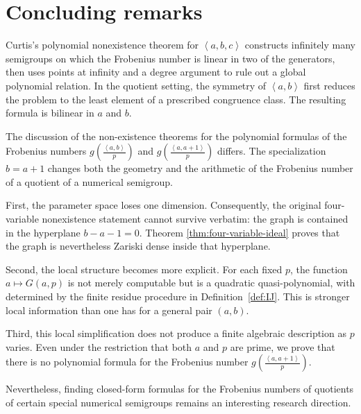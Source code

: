 \documentclass[reqno, 12pt]{article}
\numberwithin{equation}{section}
\theoremstyle{definition}
\newcommand{\gen}[1]{\left\langle #1\right\rangle}
\begin{document}
\section{Concluding remarks}\label{Section-Finily-CR}

Curtis's polynomial nonexistence theorem \cite{F.Curtis} for $\gen{a,b,c}$ constructs infinitely many semigroups on which the Frobenius number is linear in two of the generators, then uses points at infinity and a degree argument to rule out a global polynomial relation.  In the quotient setting, the symmetry of $\gen{a,b}$ first reduces the problem to the least element of a prescribed congruence class.  The resulting formula is bilinear in $a$ and $b$.

The discussion of the non-existence theorems for the polynomial formulas of the Frobenius numbers $g\!\left(\frac{\gen{a,b}}{p}\right)$ and $g\!\left(\frac{\gen{a,a+1}}{p}\right)$ differs.
The specialization $b=a+1$ changes both the geometry and the arithmetic of the Frobenius number of a quotient of a numerical semigroup.

First, the parameter space loses one dimension.  Consequently, the original four-variable nonexistence statement cannot survive verbatim: the graph is contained in the hyperplane $b-a-1=0$.  Theorem \ref{thm:four-variable-ideal} proves that the graph is nevertheless Zariski dense inside that hyperplane. 

Second, the local structure becomes more explicit.  For each fixed $p$, the
function $a\mapsto G(a,p)$ is not merely computable but is a quadratic
quasi-polynomial, with determined by the finite residue procedure
in Definition~\ref{def:IJ}.  This is stronger local information than one has
for a general pair $(a,b)$.

Third, this local simplification does not produce a finite algebraic description as $p$ varies. Even under the restriction that both 
$a$ and $p$ are prime, we prove that there is no polynomial formula for the Frobenius number $g\!\left(\frac{\gen{a,a+1}}{p}\right)$.

Nevertheless, finding closed-form formulas for the Frobenius numbers of quotients of certain special numerical semigroups remains an interesting research direction.



\end{document}
